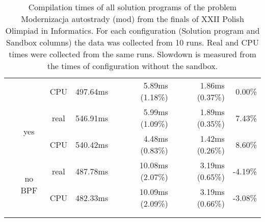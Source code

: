 \documentclass[en]{pracamgr}
\begin{document}
\begin{appendices}
\begin{small}
\begin{longtable}{|l|c|c|r|r|r|r|}
                            &                         & CPU  & 497.64ms & 5.89ms (1.18\%) & 1.86ms (0.37\%) & 0.00\% \\*
                            \cline{2-7}
                            & \multirow{2}{*}{yes}    & real & 546.91ms & 5.99ms (1.09\%) & 1.89ms (0.35\%) & 7.43\% \\*
                            &                         & CPU  & 540.42ms & 4.48ms (0.83\%) & 1.42ms (0.26\%) & 8.60\% \\*
                            \cline{2-7}
                            & \multirow{2}{*}{no BPF} & real & 487.78ms & 10.08ms (2.07\%) & 3.19ms (0.65\%) & -4.19\% \\*
                            &                         & CPU  & 482.33ms & 10.09ms (2.09\%) & 3.19ms (0.66\%) & -3.08\% \\
\hline
\multicolumn{1}{c}{}\\ %
\caption{Compilation times of all solution programs of the problem Modernizacja autostrady (mod) from the finals of XXII Polish Olimpiad in Informatics. For each configuration (Solution program and Sandbox columns) the data was collected from 10 runs. Real and CPU times were collected from the same runs. Slowdown is measured from the times of configuration without the sandbox.}
\label{table:mod_compilation}
\end{longtable}
\end{small}


\end{appendices}
\end{document}
